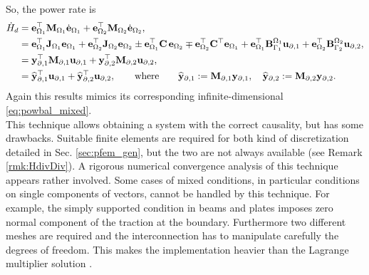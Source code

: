 So, the power rate is 
\begin{equation}
\begin{aligned}
\dot{H}_d &= {\mathbf{e}}_{\Omega_1}^\top \mathbf{M}_{\Omega_1}
\dot{\mathbf{e}}_{\Omega_1} + {\mathbf{e}}_{\Omega_2}^\top \mathbf{M}_{\Omega_2}
\dot{\mathbf{e}}_{\Omega_2}, \\
&= {\mathbf{e}}_{\Omega_1}^\top \mathbf{J}_{\Omega_1} {\mathbf{e}}_{\Omega_1} + {\mathbf{e}}_{\Omega_2}^\top \mathbf{J}_{\Omega_2} {\mathbf{e}}_{\Omega_2} \pm {\mathbf{e}}_{\Omega_1}^\top \mathbf{C} \, {\mathbf{e}}_{\Omega_2} \mp {\mathbf{e}}_{\Omega_2}^\top \mathbf{C}^\top {\mathbf{e}}_{\Omega_1} +  {\mathbf{e}}_{\Omega_1}^\top \mathbf{B}_{\Gamma_1}^{\Omega_1} {\mathbf{u}_{\partial, 1}} + {\mathbf{e}}_{\Omega_2}^\top \mathbf{B}_{\Gamma_2}^{\Omega_2} {\mathbf{u}_{\partial, 2}}, \\
&= \mathbf{y}_{\partial, 1}^\top \mathbf{M}_{\partial, 1} \mathbf{u}_{\partial, 1} + \mathbf{y}_{\partial, 2}^\top \mathbf{M}_{\partial, 2} \mathbf{u}_{\partial, 2}, \\
&= \widehat{\mathbf{y}}_{\partial, 1}^\top \mathbf{u}_{\partial, 1} + \widehat{\mathbf{y}}_{\partial, 2}^\top \mathbf{u}_{\partial, 2}, \qquad \text{where} \qquad \widehat{\mathbf{y}}_{\partial, 1} :=\mathbf{M}_{\partial, 1} \mathbf{y}_{\partial, 1}, \quad \widehat{\mathbf{y}}_{\partial, 2} :=\mathbf{M}_{\partial, 2} \mathbf{y}_{\partial, 2}.
\end{aligned}
\end{equation}
Again this results mimics its corresponding infinite-dimensional \eqref{eq:powbal_mixed}. \\


This technique allows obtaining a system with the correct causality, but has some drawbacks.  
Suitable finite elements are required for both kind of discretization detailed in Sec. \ref{sec:pfem_gen}, but the two are not always available (see Remark \ref{rmk:HdivDiv}). A rigorous numerical convergence analysis of this technique appears rather involved.  Some cases of mixed conditions, in particular conditions on single components of vectors, cannot be handled by this technique. For example, the simply supported condition in beams and plates imposes zero normal component of the traction at the boundary. Furthermore two different meshes are required and the interconnection has to manipulate carefully the degrees of freedom. This makes the implementation heavier than the Lagrange multiplier solution .


